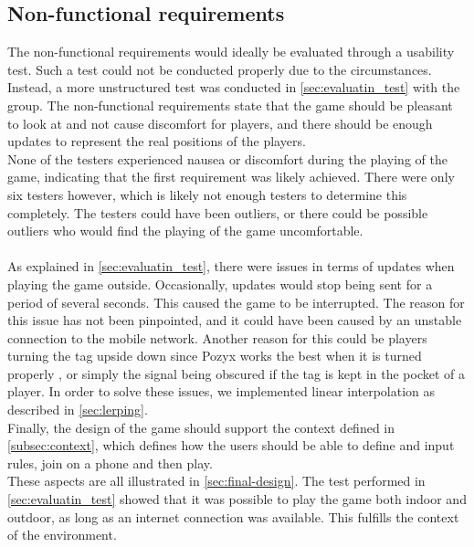 \subsection{Non-functional requirements}
The non-functional requirements would ideally be evaluated through a usability test.
Such a test could not be conducted properly due to the circumstances.
Instead, a more unstructured test was conducted in \autoref{sec:evaluatin_test} with the group.
The non-functional requirements state that the game should be pleasant to look at and not cause discomfort for players, and there should be enough updates to represent the real positions of the players.\\
None of the testers experienced nausea or discomfort during the playing of the game, indicating that the first requirement was likely achieved.
There were only six testers however, which is likely not enough testers to determine this completely.
The testers could have been outliers, or there could be possible outliers who would find the playing of the game uncomfortable.\\\\
As explained in \autoref{sec:evaluatin_test}, there were issues in terms of updates when playing the game outside.
Occasionally, updates would stop being sent for a period of several seconds.
This caused the game to be interrupted.
The reason for this issue has not been pinpointed, and it could have been caused by an unstable connection to the mobile network.
Another reason for this could be players turning the tag upside down since Pozyx works the best when it is turned properly \cite{pozyx-AnchorHeights}, or simply the signal being obscured if the tag is kept in the pocket of a player.
In order to solve these issues, we implemented linear interpolation as described in \autoref{sec:lerping}.\\
Finally, the design of the game should support the context defined in \autoref{subsec:context}, which defines how the users should be able to define and input rules, join on a phone and then play.\\
These aspects are all illustrated in \autoref{sec:final-design}.
The test performed in \autoref{sec:evaluatin_test} showed that it was possible to play the game both indoor and outdoor, as long as an internet connection was available.
This fulfills the context of the environment.
